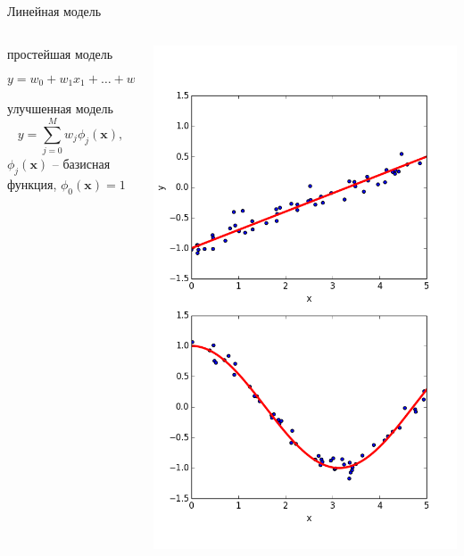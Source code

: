 \documentclass[10pt]{beamer}
\begin{document}
\begin{frame}{Линейная модель}

\begin{columns}[C]
    \begin{column}{.55\textwidth}
    	простейшая модель
    	\[
    	y = w_0 + w_1 x_1 + \ldots + w_M x_M = \sum_{j=0}^M w_j x_j
    	\]
    	улучшенная модель
    	\[
    	y = \sum_{j=0}^M w_j \phi_j(\mathbf{x}),
    	\]
    	$\phi_j(\mathbf{x})$ -- базисная функция, $\phi_0(\mathbf{x}) = 1$
    \end{column}
       
    \begin{column}{.45\textwidth}
	\begin{center}
   		\includegraphics[scale=0.3]{images/full_reg.png}
    \end{center}
    \end{column}
  \end{columns}

\end{frame}
\end{document}

